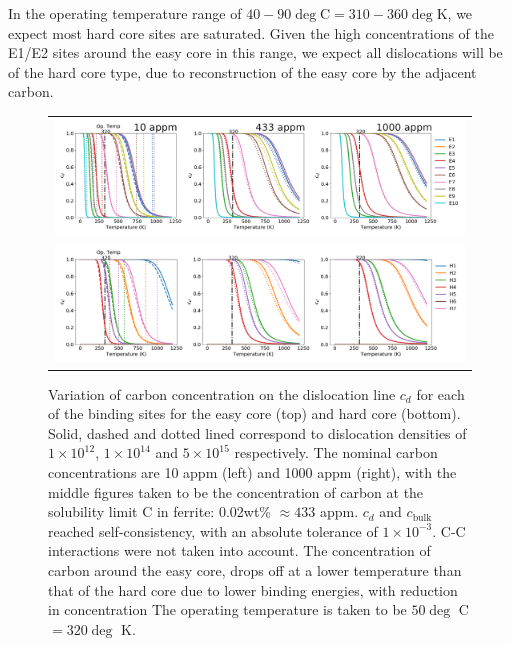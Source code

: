 \documentclass[a4paper,11pt]{article}
\begin{document}
In the operating temperature range of \(40-90\deg\text{C} = 310-360\deg\text{K}\), we expect most hard
core sites are saturated. Given the high concentrations of the E1/E2 sites around the easy core
in this range, we expect all dislocations will be of the hard core type, due to reconstruction of
the easy core by the adjacent carbon.



\begin{landscape}
   \begin{figure}	
       \begin{tabular}{c}
      	        \includegraphics[width=1.65\textwidth]{Images/cd_easy_core_ferrite_sc_all_10_433_1000_appm.png}  \\
      	        \includegraphics[width=1.65\textwidth]{Images/cd_hard_core_ferrite_sc_all_10_433_1000_appm.png}  \\

          	   \end{tabular}		
   \caption{ Variation of carbon concentration on the dislocation line $c_d$ for each of the binding sites for the easy core (top) and hard core (bottom). Solid, dashed and dotted lined correspond to dislocation densities of $1\times10^{12}$, $1\times10^{14}$ and $5\times10^{15}$ respectively. The nominal carbon concentrations are 10 appm (left) and 1000 appm (right), with the middle figures taken to be the concentration of carbon at the solubility limit C in ferrite: 0.02wt\% $\approx433$ appm. $c_d$ and $c_{\text{bulk}}$ reached self-consistency, with an absolute tolerance of $1\times10^{-3}$. C-C interactions were not taken into account. The concentration of carbon around the easy core, drops off at a lower temperature than that of the hard core due to lower binding energies, with reduction in concentration  The operating temperature is taken to be $50\deg$ C $= 320 \deg$ K. }
   \label{cdhardeasy}
      \end{figure}
      \end{landscape}
\end{document}
